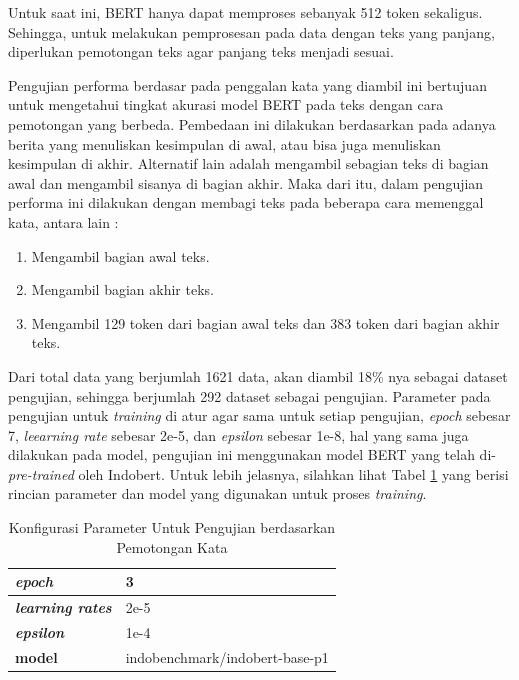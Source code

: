 Untuk saat ini, BERT hanya dapat memproses sebanyak 512 token sekaligus. Sehingga, untuk melakukan pemprosesan pada data dengan teks yang panjang, diperlukan pemotongan teks agar panjang teks menjadi sesuai.

Pengujian performa berdasar pada penggalan kata yang diambil ini bertujuan untuk mengetahui tingkat akurasi model BERT pada teks dengan cara pemotongan yang berbeda. Pembedaan ini dilakukan berdasarkan pada adanya berita yang menuliskan kesimpulan di awal, atau bisa juga menuliskan kesimpulan di akhir. Alternatif lain adalah mengambil sebagian teks di bagian awal dan mengambil sisanya di bagian akhir. Maka dari itu, dalam pengujian performa ini dilakukan dengan membagi teks pada beberapa cara memenggal kata, antara lain :

\begin{enumerate}[nolistsep]
    \item Mengambil bagian awal teks.
    \item Mengambil bagian akhir teks.
    \item Mengambil 129 token dari bagian awal teks dan 383 token dari bagian akhir teks.
\end{enumerate}

Dari total data yang berjumlah 1621 data, akan diambil 18\% nya sebagai dataset pengujian, sehingga berjumlah 292 dataset sebagai pengujian. Parameter pada pengujian untuk \textit{training} di atur agar sama untuk setiap pengujian, \textit{epoch} sebesar 7, \textit{leearning rate} sebesar 2e-5, dan \textit{epsilon} sebesar 1e-8, hal yang sama juga dilakukan pada model, pengujian ini menggunakan model BERT yang telah di-\textit{pre-trained} oleh Indobert. Untuk lebih jelasnya, silahkan lihat Tabel \ref{tab: truncate_param} yang berisi rincian parameter dan model yang digunakan untuk proses \textit{training}.

\begin{table}
    \label{tab: truncate_param}
    \caption{Konfigurasi Parameter Untuk Pengujian berdasarkan Pemotongan Kata}
    \centering
    \begin{tabular}{|l|l|}
        \hline
        \textit{\textbf{epoch}}          & 3                              \\ \hline
        \textit{\textbf{learning rates}} & 2e-5                           \\ \hline
        \textit{\textbf{epsilon}}        & 1e-4                           \\ \hline
        \textbf{model}                   & indobenchmark/indobert-base-p1 \\ \hline
    \end{tabular}
\end{table}


